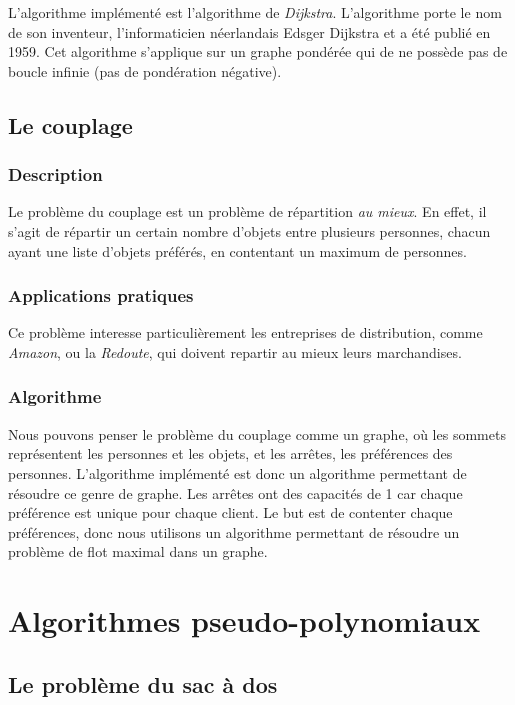 	L'algorithme implémenté est l'algorithme de \emph{Dijkstra}. L'algorithme porte le nom de son inventeur, 
	l'informaticien néerlandais Edsger Dijkstra et a été publié en 1959. Cet algorithme s'applique sur un graphe pondérée 
	qui de ne possède pas de boucle infinie (pas de pondération négative).

    \subsection{Le couplage}
        \subsubsection{Description}
            Le problème du couplage est un problème de répartition \emph{au mieux}.
            En effet, il s'agit de répartir un certain nombre d'objets
            entre plusieurs personnes, chacun ayant une liste d'objets
            préférés, en contentant un maximum de personnes.
        \subsubsection{Applications pratiques}
            Ce problème interesse particulièrement les entreprises
            de distribution, comme \emph{Amazon},
            ou la \emph{Redoute}, qui doivent
            repartir au mieux leurs marchandises.
        \subsubsection{Algorithme}
		Nous pouvons penser le problème du couplage comme un graphe,
		 où les sommets représentent les personnes et les objets,
		 et les arrêtes, les préférences des personnes.
		L'algorithme implémenté est donc un algorithme permettant
		 de résoudre ce genre de graphe.
		Les arrêtes ont des capacités de 1 car chaque préférence est unique
		 pour chaque client.
		Le but est de contenter chaque préférences, donc nous utilisons un
		 algorithme permettant de résoudre un problème de flot maximal
		 dans un graphe.



\section{Algorithmes pseudo-polynomiaux}
    \subsection{Le problème du sac à dos}
